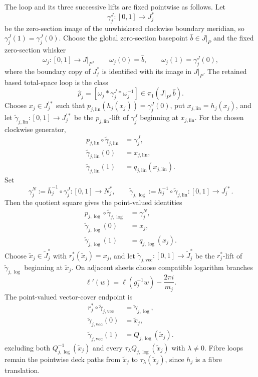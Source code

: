 \begin{enumerate}[leftmargin=1.8em,itemsep=.65em]
The loop and its three successive lifts are fixed pointwise as follows.  Let
\[
 \gamma_j^J:[0,1]\longrightarrow J_j^*
\]
be the zero-section image of the unwhiskered clockwise boundary meridian,
so $\gamma_j^J(1)=\gamma_j^J(0)$.  Choose the global zero-section basepoint
$\widehat b\in J|_P$ and the fixed zero-section whisker
\[
 \omega_j:[0,1]\longrightarrow J|_P,\qquad
 \omega_j(0)=\widehat b,\qquad
 \omega_j(1)=\gamma_j^J(0),
\]
where the boundary copy of $J_j^*$ is identified with its image in $J|_P$.
The retained based total-space loop is the class
\[
 \widehat\rho_j
 =[\omega_j*\gamma_j^J*\omega_j^{-1}]
 \in\pi_1(J|_P,\widehat b).
\]
Choose $x_j\in J_j^{\prime *}$ such that
$p_{j,\mathrm{lin}}(h_j(x_j))=\gamma_j^J(0)$, put
$x_{j,\mathrm{lin}}=h_j(x_j)$, and let
$\widetilde\gamma_{j,\mathrm{lin}}:[0,1]\to J_j^{\prime *}$ be the
$p_{j,\mathrm{lin}}$-lift of $\gamma_j^J$ beginning at
$x_{j,\mathrm{lin}}$.  For the chosen clockwise generator,
\[
\begin{aligned}
 p_{j,\mathrm{lin}}\circ\widetilde\gamma_{j,\mathrm{lin}}
 &=\gamma_j^J,\\
 \widetilde\gamma_{j,\mathrm{lin}}(0)&=x_{j,\mathrm{lin}},\\
 \widetilde\gamma_{j,\mathrm{lin}}(1)
 &=q_{j,\mathrm{lin}}(x_{j,\mathrm{lin}}).
\end{aligned}
\]
Set
\[
 \gamma_j^N:=\bar h_j^{-1}\circ\gamma_j^J:[0,1]\longrightarrow N_j^*,
 \qquad
 \widetilde\gamma_{j,\log}:=h_j^{-1}\circ
 \widetilde\gamma_{j,\mathrm{lin}}:[0,1]\longrightarrow J_j^{\prime *}.
\]
Then the quotient square gives the point-valued identities
\[
\begin{aligned}
 p_{j,\log}\circ\widetilde\gamma_{j,\log}&=\gamma_j^N,\\
 \widetilde\gamma_{j,\log}(0)&=x_j,\\
 \widetilde\gamma_{j,\log}(1)&=q_{j,\log}(x_j).
\end{aligned}
\]
Choose $\widetilde x_j\in\widetilde J_j^*$ with
$r_j^*(\widetilde x_j)=x_j$, and let
$\widetilde\gamma_{j,\mathrm{vec}}:[0,1]\to\widetilde J_j^*$ be the
$r_j^*$-lift of $\widetilde\gamma_{j,\log}$ beginning at
$\widetilde x_j$.  On adjacent sheets choose compatible logarithm branches
\[
 \ell'(w)=\ell(g_j^{-1}w)-\frac{2\pi i}{m_j}.
\]
The point-valued vector-cover endpoint is
\[
\begin{aligned}
 r_j^*\circ\widetilde\gamma_{j,\mathrm{vec}}
 &=\widetilde\gamma_{j,\log},\\
 \widetilde\gamma_{j,\mathrm{vec}}(0)&=\widetilde x_j,\\
 \widetilde\gamma_{j,\mathrm{vec}}(1)
 &=Q_{j,\log}(\widetilde x_j).
\end{aligned}
\]
excluding both $Q_{j,\log}^{-1}(\widetilde x_j)$ and every
$\tau_\lambda Q_{j,\log}(\widetilde x_j)$ with $\lambda\ne0$.  Fibre loops
remain the pointwise deck paths from $\widetilde x_j$ to
$\tau_\lambda(\widetilde x_j)$, since $h_j$ is a fibre translation.


\end{enumerate}
